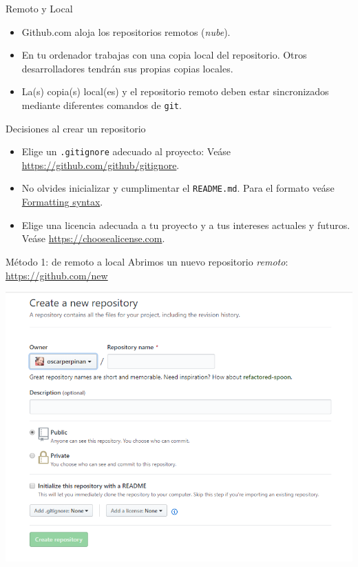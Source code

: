 \documentclass[xcolor={usenames,svgnames,dvipsnames}]{beamer}
\begin{document}
\begin{frame}[label={sec:orgd5f3c42},fragile]{Remoto y Local}
 \begin{itemize}
\item \alert{Github.com} aloja los \alert{repositorios remotos} (\emph{nube}).
\item En tu ordenador trabajas con una \alert{copia local} del repositorio. Otros desarrolladores tendrán sus propias copias locales.
\item La(s) copia(s) local(es) y el repositorio remoto deben estar \alert{sincronizados} mediante diferentes comandos de \texttt{git}.
\end{itemize}
\end{frame}
\begin{frame}[label={sec:org1d387eb},fragile]{Decisiones al crear un repositorio}
 \begin{itemize}
\item Elige un \alert{\texttt{.gitignore}} adecuado al proyecto: Veáse \url{https://github.com/github/gitignore}.
\item No olvides inicializar y cumplimentar el \alert{\texttt{README.md}}. Para el formato veáse \href{https://help.github.com/articles/basic-writing-and-formatting-syntax/}{Formatting syntax}.
\item Elige una \alert{licencia} adecuada a tu proyecto y a tus intereses actuales y futuros. Veáse \url{https://choosealicense.com}.
\end{itemize}
\end{frame}

\begin{frame}[label={sec:orgfdb0600}]{Método 1: de remoto a local}
Abrimos un nuevo repositorio \emph{remoto}: \url{https://github.com/new}

\begin{center}
\includegraphics[width=.9\linewidth]{figs/GitHub_New_Repository.png}
\end{center}
\end{frame}
\end{document}
